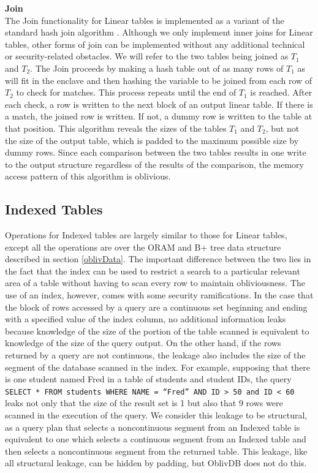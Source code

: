 \documentclass[conference]{IEEEtran}
\def\name/{OblivDB}
\begin{document}
\medskip \noindent \textbf{Join}\\
The Join functionality for Linear tables is implemented as a variant of the standard hash join algorithm \cite{EN10}. Although we only implement inner joins for Linear tables, other forms of join can be implemented without any additional technical or security-related obstacles. We will refer to the two tables being joined as $T_1$ and $T_2$. The Join proceeds by making a hash table out of as many rows of $T_1$ as will fit in the enclave and then hashing the variable to be joined from each row of $T_2$ to check for matches. This process repeats until the end of $T_1$ is reached. After each check, a row is written to the next block of an output linear table. If there is a match, the joined row is written. If not, a dummy row is written to the table at that position. This algorithm reveals the sizes of the tables $T_1$ and $T_2$, but not the size of the output table, which is padded to the maximum possible size by dummy rows. Since each comparison between the two tables results in one write to the output structure regardless of the results of the comparison, the memory access pattern of this algorithm is oblivious. 

\subsection{Indexed Tables}

Operations for Indexed tables are largely similar to those for Linear tables, except all the operations are over the ORAM and B+ tree data structure described in section \ref{oblivData}. The important difference between the two lies in the fact that the index can be used to restrict a search to a particular relevant area of a table without having to scan every row to maintain obliviousness. The use of an index, however, comes with some security ramifications. In the case that the block of rows accessed by a query are a continuous set beginning and ending with a specified value of the index column, no additional information leaks because knowledge of the size of the portion of the table scanned is equivalent to knowledge of the size of the query output. On the other hand, if the rows returned by a query are not continuous, the leakage also includes the size of the segment of the database scanned in the index. For example, supposing that there is one student named Fred in a table of students and student IDs,  the query \texttt{SELECT * FROM students WHERE NAME = ``Fred'' AND ID > 50 and ID < 60} leaks not only that the size of the result set is 1 but also that 9 rows were scanned in the execution of the query. We consider this leakage to be structural, as a query plan that selects a noncontinuous segment from an Indexed table is equivalent to one which selects a continuous segment from an Indexed table and then selects a noncontinuous segment from the returned table. This leakage, like all structural leakage, can be hidden by padding, but \name/ does not do this. 
\end{document}
